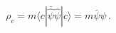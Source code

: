 \begin{equation}
\rho_c=m\langle c|\bar{\hat\psi}{\hat\psi}|c \rangle= m \bar\psi \psi \, .
\end{equation}

